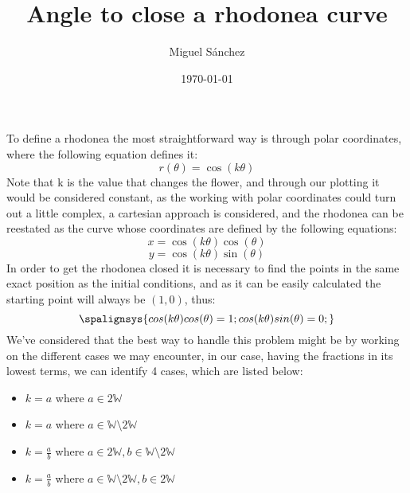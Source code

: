\documentclass[12pt, a4paper]{article}
\author{Miguel Sánchez}
\title{Angle to close a rhodonea curve}
\date{\today}
\begin{document}
\maketitle
\noindent
To define a rhodonea the most straightforward way is through polar coordinates, where the following equation defines it:
 \begin{equation}
  r(\theta) = \cos(k\theta)
 \end{equation}
 Note that k is the value that changes the flower, and through our plotting it would be considered constant, as the working with polar coordinates could turn out a little complex, a cartesian approach is considered, and the rhodonea can be reestated as the curve whose coordinates are defined by the following equations:
 \begin{equation}
  x = \cos(k\theta)\cos(\theta)
 \end{equation}
 \begin{equation}
  y = \cos(k\theta)\sin(\theta)
 \end{equation}
 In order to get the rhodonea closed it is necessary to find the points in the same exact position as the initial conditions, and as it can be easily calculated the starting point will always be $(1,0)$, thus:
\[
  \spalignsys{
    cos (k\theta)cos(\theta) = 1 ;
    cos (k\theta)sin(\theta) = 0 ;
  }
\]
We've considered that the best way to handle this problem might be by working on the different cases we may encounter, in our case, having the fractions in its lowest terms, we can identify 4 cases, which are listed below:
\begin{itemize}
 \item $k = a$ where $a\in2\mathbb{W}$
 \item $k = a$ where $a\in\mathbb{W}\setminus2\mathbb{W}$
 \item $k = \frac{a}{b}$ where $a \in2\mathbb{W}, b \in\mathbb{W}\setminus2\mathbb{W}$
 \item $k = \frac{a}{b}$ where $a\in\mathbb{W}\setminus2\mathbb{W}, b\in2\mathbb{W}$
\end{itemize}
\end{document}
